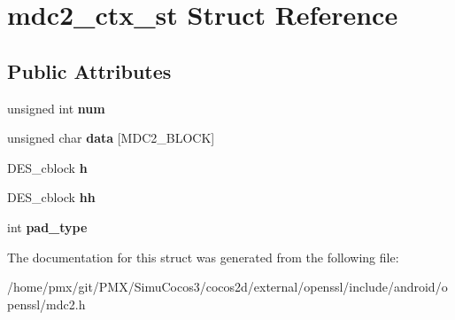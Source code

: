 \hypertarget{structmdc2__ctx__st}{}\section{mdc2\+\_\+ctx\+\_\+st Struct Reference}
\label{structmdc2__ctx__st}
\subsection*{Public Attributes}
\begin{DoxyCompactItemize}
\item 
\mbox{\label{structmdc2__ctx__st_af85d040e72cfb4508023fb0ea68fcd77}} 
unsigned int {\bfseries num}
\item 
\mbox{\label{structmdc2__ctx__st_a7b7c35f2a890baa85d17615e50c0cde2}} 
unsigned char {\bfseries data} \mbox{[}M\+D\+C2\+\_\+\+B\+L\+O\+CK\mbox{]}
\item 
\mbox{\label{structmdc2__ctx__st_affcbad02a87a1e029e62afafc4d587de}} 
D\+E\+S\+\_\+cblock {\bfseries h}
\item 
\mbox{\label{structmdc2__ctx__st_afd6b835d0ca4e70e3b046bd88c10aa8b}} 
D\+E\+S\+\_\+cblock {\bfseries hh}
\item 
\mbox{\label{structmdc2__ctx__st_a98ad50463fcdc70534875520374dd08d}} 
int {\bfseries pad\+\_\+type}
\end{DoxyCompactItemize}


The documentation for this struct was generated from the following file\+:\begin{DoxyCompactItemize}
\item 
/home/pmx/git/\+P\+M\+X/\+Simu\+Cocos3/cocos2d/external/openssl/include/android/openssl/mdc2.\+h\end{DoxyCompactItemize}
